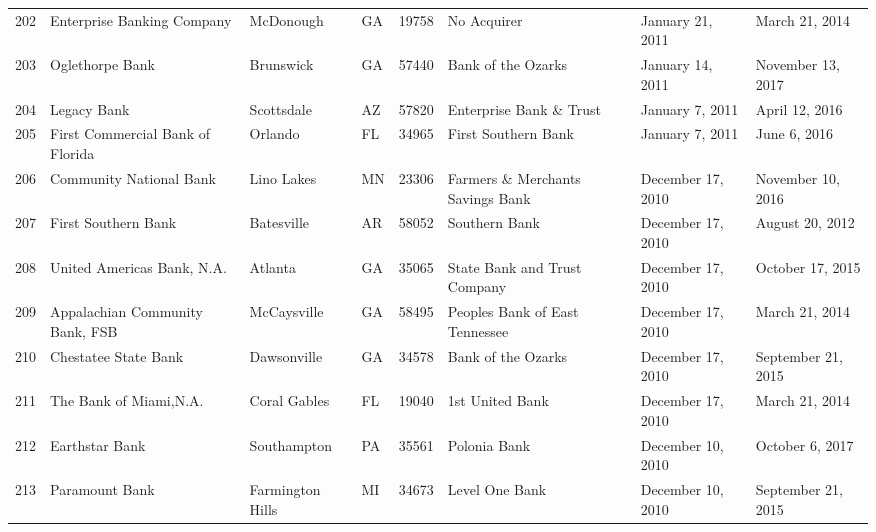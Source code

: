 \begin{tabular}{llllrlll}
202 &                         Enterprise Banking Company &           McDonough &  GA &  19758 &                                        No Acquirer &    January 21, 2011 &      March 21, 2014 \\
203 &                                    Oglethorpe Bank &           Brunswick &  GA &  57440 &                                 Bank of the Ozarks &    January 14, 2011 &   November 13, 2017 \\
204 &                                        Legacy Bank &          Scottsdale &  AZ &  57820 &                            Enterprise Bank \& Trust &     January 7, 2011 &      April 12, 2016 \\
205 &                   First Commercial Bank of Florida &             Orlando &  FL &  34965 &                                First Southern Bank &     January 7, 2011 &        June 6, 2016 \\
206 &                            Community National Bank &          Lino Lakes &  MN &  23306 &                   Farmers \& Merchants Savings Bank &   December 17, 2010 &   November 10, 2016 \\
207 &                                First Southern Bank &          Batesville &  AR &  58052 &                                      Southern Bank &   December 17, 2010 &     August 20, 2012 \\
208 &                         United Americas Bank, N.A. &             Atlanta &  GA &  35065 &                       State Bank and Trust Company &   December 17, 2010 &    October 17, 2015 \\
209 &                    Appalachian Community Bank, FSB &         McCaysville &  GA &  58495 &                     Peoples Bank of East Tennessee &   December 17, 2010 &      March 21, 2014 \\
210 &                               Chestatee State Bank &         Dawsonville &  GA &  34578 &                                 Bank of the Ozarks &   December 17, 2010 &  September 21, 2015 \\
211 &                             The Bank of Miami,N.A. &        Coral Gables &  FL &  19040 &                                    1st United Bank &   December 17, 2010 &      March 21, 2014 \\
212 &                                     Earthstar Bank &         Southampton &  PA &  35561 &                                       Polonia Bank &   December 10, 2010 &     October 6, 2017 \\
213 &                                     Paramount Bank &    Farmington Hills &  MI &  34673 &                                     Level One Bank &   December 10, 2010 &  September 21, 2015 \\

\end{tabular}
